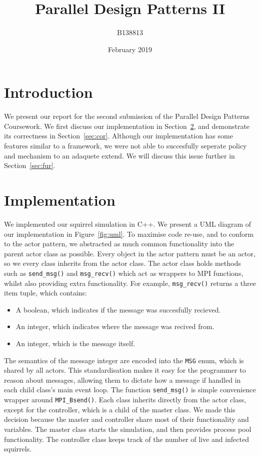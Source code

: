 \documentclass[oneside]{article}
\title{Parallel Design Patterns II}
\author{B138813}
\date{February 2019}
\begin{document}

\maketitle
\section{Introduction}
We present our report for the second submission of the Parallel Design Patterns Coursework. We first discuss our implementation in Section~\ref{sec:imp}, and demonstrate its correctness in Section~\ref{sec:cor}. Although our implementation has some features similar to a framework, we were not able to succesfully seperate policy and mechanism to an adaquete extend. We will discuss this issue further in Section~\ref{sec:fur}.



\section{Implementation}\label{sec:imp}
We implemented our squirrel simulation in C++. We present a UML diagram of our implementation in Figure~\ref{fig:uml}. To maximise code re-use, and to conform to the actor pattern, we abstracted as much common functionality into the parent actor class as possible. Every object in the actor pattern must be an actor, so we every class inherits from the actor class. The actor class holds methods such as \texttt{send\_msg()} and \texttt{msg\_recv()} which act as wrappers to MPI functions, whilst also providing extra functionality. For example, \texttt{msg\_recv()} returns a three item tuple, which contains:

\begin{itemize}
  \item A boolean, which indicates if the message was succesfully recieved.
  \item An integer, which indicates where the message was recived from.
  \item An integer, which is the message itself.
\end{itemize}
The semantics of the message integer are encoded into the \texttt{MSG} enum, which is shared by all actors. This standardisation makes it easy for the programmer to reason about messages, allowing them to dictate how a message if handled in each child class's main event loop. The function \texttt{send\_msg()} is simple convenience wrapper around \texttt{MPI\_Bsend()}. Each class inherits directly from the actor class, except for the controller, which is a child of the master class. We made this decision because the master and controller share most of their functionality and variables. The master class starts the simulation, and then provides process pool functionality. The controller class keeps track of the number of live and infected squirrels.
\end{document}
